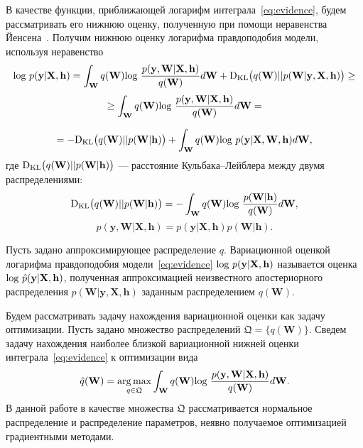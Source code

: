 {В качестве функции, приближающей логарифм интеграла~\eqref{eq:evidence}, будем рассматривать его нижнюю оценку, полученную при помощи неравенства Йенсена~\cite{Bishop}. Получим нижнюю оценку логарифма правдоподобия модели, используя неравенство}
\begin{equation} 
\label{eq:elbo}
\textnormal{log}~p(\mathbf{y}|\mathbf{X},\mathbf{h})  = \int_{\mathbf{W}} q(\mathbf{W})\textnormal{log}~\frac{p(\mathbf{y},\mathbf{W}|\mathbf{X},\mathbf{h})}{q(\mathbf{W})}d\mathbf{W} + \textnormal{D}_\textnormal{KL}  \bigl(q(\mathbf{W})||p(\mathbf{W}|\mathbf{y}, \mathbf{X},\mathbf{h})\bigr) \geq	
\end{equation} 
$$
\geq \int_{\mathbf{W}} q(\mathbf{W})\textnormal{log}~\frac{p(\mathbf{y},\mathbf{W}|\mathbf{X},\mathbf{h})}{q(\mathbf{W})}d\mathbf{W} =
$$

$$
= -\textnormal{D}_\textnormal{KL} \bigl(q(\mathbf{W})||p(\mathbf{W}|\mathbf{h})\bigr) + \int_{\mathbf{W}} q(\mathbf{W})\textnormal{log}~{p(\mathbf{y}|\mathbf{X},\mathbf{W},\mathbf{h})} d \mathbf{W},
$$
где $\textnormal{D}_\textnormal{KL}\bigl(q(\mathbf{W})||p(\mathbf{W} |\mathbf{h})\bigr)$ --- расстояние Кульбака--Лейблера между двумя распределениями: $$\textnormal{D}_\textnormal{KL}\bigl(q(\mathbf{W})||p(\mathbf{W} |\mathbf{h})\bigr) = -\int_{\mathbf{W}} q(\mathbf{W})\textnormal{log}~\frac{p(\mathbf{W} | \mathbf{h})}{q(\mathbf{W})}d\mathbf{W},$$
$$
p(\mathbf{y},\mathbf{W}|\mathbf{X},\mathbf{h}) = p(\mathbf{y}|\mathbf{X},\mathbf{h})p(\mathbf{W}|\mathbf{h}).
$$

\begin{defin}
Пусть задано аппроксимирующее распределение $q$.
Вариационной оценкой логарифма правдоподобия модели~\eqref{eq:evidence} $\textnormal{log}~p(\mathbf{y}|\mathbf{X},\mathbf{h})$ называется оценка $\textnormal{log}~\hat{p}(\mathbf{y}|\mathbf{X},\mathbf{h})$, полученная аппроксимацией неизвестного апостериорного распределения $p(\mathbf{W}| \mathbf{y}, \mathbf{X},\mathbf{h})$ заданным распределением $q(\mathbf{W})$.
\end{defin}

Будем рассматривать задачу нахождения вариационной оценки как задачу оптимизации. Пусть задано множество распределений $\mathfrak{Q} =\{q(\mathbf{W})\}$. Сведем задачу нахождения наиболее близкой вариационной нижней оценки интеграла~\eqref{eq:evidence} к оптимизации вида
\[
     \hat{q}(\mathbf{W}) = \operatorname*{arg\,max}_{q \in \mathfrak{Q}}  \int_{\mathbf{W}} q(\mathbf{W})\textnormal{log}~\frac{p(\mathbf{y},\mathbf{W}|\mathbf{X},\mathbf{h})}{q(\mathbf{W})}d\mathbf{W}.
\]  
В данной работе в качестве множества $\mathfrak{Q}$ рассматривается нормальное распределение и распределение параметров, неявно получаемое оптимизацией градиентными методами. 

